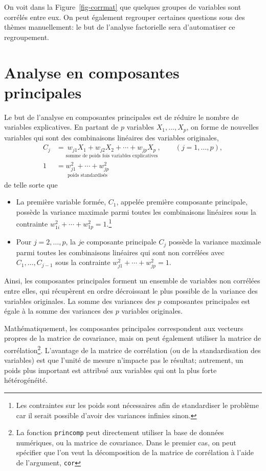 \documentclass[
  11pt,
  letterpaper,
]{book}
\providecommand{\tightlist}{%
  \setlength{\itemsep}{0pt}\setlength{\parskip}{0pt}}\usepackage{longtable,booktabs,array}
\theoremstyle{definition}
\theoremstyle{remark}
\begin{document}
On voit dans la Figure~\ref{fig-corrmat} que quelques groupes de
variables sont corrélés entre eux. On peut également regrouper certaines
questions sous des thèmes manuellement: le but de l'analyse factorielle
sera d'automatiser ce regroupement.

\hypertarget{analyse-en-composantes-principales}{%
\section{Analyse en composantes
principales}\label{analyse-en-composantes-principales}}

Le but de l'analyse en composantes principales est de réduire le nombre
de variables explicatives. En partant de \(p\) variables
\(X_1, \ldots, X_p\), on forme de nouvelles variables qui sont des
combinaisons linéaires des variables originales, \begin{align*}
C_j &= \underset{\text{somme de poids fois variables explicatives}}{w_{j1} X_1 + w_{j2} X_2 + \cdots + w_{jp} X_p}, \qquad (j=1, \ldots, p),
\\
1 &= \underset{\text{poids standardisés}}{w_{j1}^2 + \cdots + w_{jp}^2}
\end{align*} de telle sorte que

\begin{itemize}
\tightlist
\item
  La première variable formée, \(C_1\), appelée première composante
  principale, possède la variance maximale parmi toutes les combinaisons
  linéaires sous la contrainte
  \(w_{1i}^2 + \cdots + w_{1p}^2=1\).\footnote{Les contraintes sur les
    poids sont nécessaires afin de standardiser le problème car il
    serait possible d'avoir des variances infinies sinon.}
\item
  Pour \(j=2, \ldots, p\), la \(j\)e composante principale \(C_j\)
  possède la variance maximale parmi toutes les combinaisons linéaires
  qui sont non corrélées avec \(C_1, \ldots, C_{j-1}\) sous la
  contrainte \(w_{j1}^2 + \cdots + w_{jp}^2=1\).
\end{itemize}

Ainsi, les composantes principales forment un ensemble de variables non
corrélées entre elles, qui récupèrent en ordre décroissant le plus
possible de la variance des variables originales. La somme des variances
des \(p\) composantes principales est égale à la somme des variances des
\(p\) variables originales.

Mathématiquement, les composantes principales correspondent aux vecteurs
propres de la matrice de covariance, mais on peut également utiliser la
matrice de corrélation\footnote{La fonction \texttt{princomp} peut
  directement utiliser la base de données numériques, ou la matrice de
  covariance. Dans le premier cas, on peut spécifier que l'on veut la
  décomposition de la matrice de corrélation à l'aide de l'argument,
  \texttt{cor}}. L'avantage de la matrice de corrélation (ou de la
standardisation des variables) est que l'unité de mesure n'impacte pas
le résultat; autrement, un poids plus important est attribué aux
variables qui ont la plus forte hétérogénéité.
\end{document}
